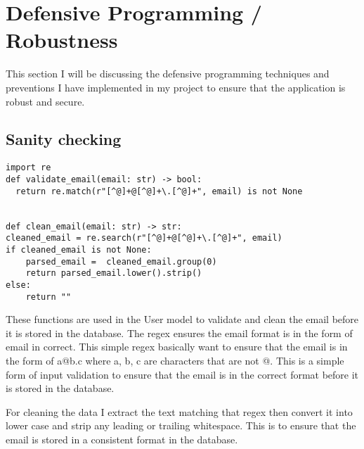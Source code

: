 \section{Defensive Programming / Robustness}
This section I will be discussing the defensive programming techniques and preventions I have implemented in my project to ensure that the application is robust and secure.

\subsection{Sanity checking}
\begin{verbatim}
import re
def validate_email(email: str) -> bool:
  return re.match(r"[^@]+@[^@]+\.[^@]+", email) is not None


def clean_email(email: str) -> str:
cleaned_email = re.search(r"[^@]+@[^@]+\.[^@]+", email)
if cleaned_email is not None:
    parsed_email =  cleaned_email.group(0)
    return parsed_email.lower().strip()
else:
    return ""
\end{verbatim}
These functions are used in the User model to validate and clean the email before it is stored in the database. The regex ensures the email format is in the form of email in correct. This simple regex basically want to ensure that the email is in the form of a@b.c where a, b, c are characters that are not @. This is a simple form of input validation to ensure that the email is in the correct format before it is stored in the database.

For cleaning the data I extract the text matching that regex then convert it into lower case and strip any leading or trailing whitespace. This is to ensure that the email is stored in a consistent format in the database.

